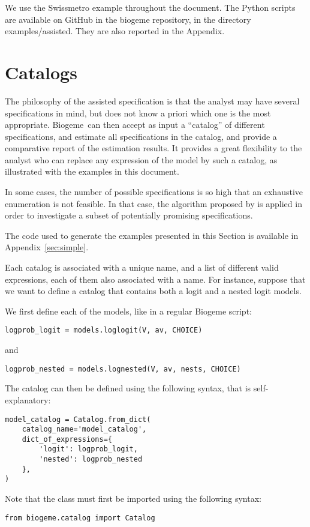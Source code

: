 \documentclass[12pt,a4paper]{article}
\newcommand{\PDBIOGEME}{Biogeme}
\begin{document}
We use the Swissmetro example throughout the document. The Python
scripts are available on GitHub in the biogeme repository, in the directory examples/assisted. They are also reported in the Appendix.

\clearpage

\section{Catalogs}\label{sec:catalogs}

The philosophy of the assisted specification is that the analyst may
have several specifications in mind, but does not know a priori which
one is the most appropriate. \PDBIOGEME\ can then accept as input a
``catalog'' of different specifications, and estimate all
specifications in the catalog, and provide a comparative report of the
estimation results. It provides a great flexibility to the analyst who
can replace any expression of the model by such a catalog, as illustrated with the examples in this document.

In some cases, the number of possible specifications is so high that
an exhaustive enumeration is not feasible. In that case, the algorithm
proposed by  is applied in order to
investigate a subset of potentially promising specifications.

 The code used to generate the examples presented in this Section is
 available in Appendix~\ref{sec:simple}.


Each catalog is associated with a unique name, and a list of different
valid expressions, each of them also associated with a name. For
instance, suppose that we want to define a catalog that contains both
a logit and a nested logit models.


We first define each of the models, like in a regular Biogeme script:
\begin{lstlisting}
logprob_logit = models.loglogit(V, av, CHOICE)
\end{lstlisting}
and
\begin{lstlisting}
logprob_nested = models.lognested(V, av, nests, CHOICE)
\end{lstlisting}

The catalog can then be defined using the following syntax, that is self-explanatory:
\begin{lstlisting}
model_catalog = Catalog.from_dict(
    catalog_name='model_catalog',
    dict_of_expressions={
        'logit': logprob_logit,
        'nested': logprob_nested
    },
)
\end{lstlisting}
Note that the \lstinline@Catalog@ class must first be imported using the following syntax:
\begin{lstlisting}
from biogeme.catalog import Catalog
\end{lstlisting}
\end{document}
